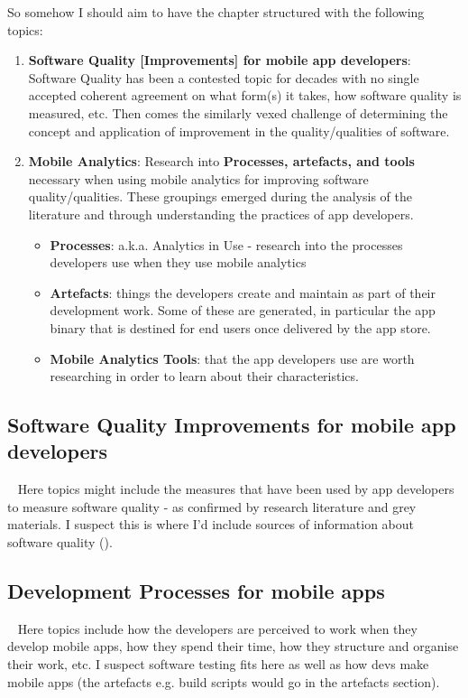 So somehow I should aim to have the chapter structured with the following topics:
\begin{enumerate}
    \item \textbf{Software Quality [Improvements] for mobile app developers}: Software Quality has been a contested topic for decades with no single accepted coherent agreement on what form(s) it takes, how software quality is measured, etc. Then comes the similarly vexed challenge of determining the concept and application of improvement in the quality/qualities of software. 
    \item \textbf{Mobile Analytics}: Research into \textbf{Processes, artefacts, and tools} necessary when using mobile analytics for improving software quality/qualities. These groupings emerged during the analysis of the literature and through understanding the practices of app developers.
    \begin{itemize}
        \item \textbf{Processes}: a.k.a. Analytics in Use - research into the processes developers use when they use mobile analytics
        \item \textbf{Artefacts}: things the developers create and maintain as part of their development work. Some of these are generated, in particular the app binary that is destined for end users once delivered by the app store.
        \item \textbf{Mobile Analytics Tools}: that the app developers use are worth researching in order to learn about their characteristics.
    \end{itemize}
\end{enumerate}

\subsection{Software Quality Improvements for mobile app developers}~\label{rw-software-quality-improvements-for-mobile-app-devs-topic}
Here topics might include the measures that have been used by app developers to measure software quality - as confirmed by research literature and grey materials. I suspect this is where I'd include sources of information about software quality ().

\subsection{Development Processes for mobile apps}~\label{rw-devt-processes-for-mobile-apps}
Here topics include how the developers are perceived to work when they develop mobile apps, how they spend their time, how they structure and organise their work, etc. I suspect software testing fits here as well as how devs make mobile apps (the artefacts e.g. build scripts would go in the artefacts section).


